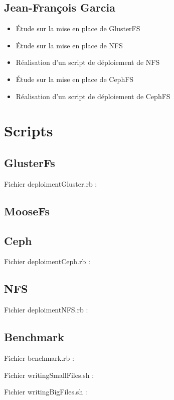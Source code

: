 \documentclass[12pt]{report}
\begin{document}
			\section{Jean-François Garcia}
				\begin{itemize}
					\item Étude sur la mise en place de GlusterFS
					\item Étude sur la mise en place de NFS
					\item Réalisation d'un script de déploiement de NFS
					\item Étude sur la mise en place de CephFS
					\item Réalisation d'un script de déploiement de CephFS
				\end{itemize}

		\chapter{Scripts}
			\section{GlusterFs}
				Fichier deploimentGluster.rb :
				
			\section{MooseFs}
			\section{Ceph}
				Fichier deploimentCeph.rb :
				
			\section{NFS}
				Fichier deploimentNFS.rb :
				
			\section{Benchmark}
				Fichier benchmark.rb :
				

				Fichier writingSmallFiles.sh :
				

				Fichier writingBigFiles.sh :
				
\end{document}
